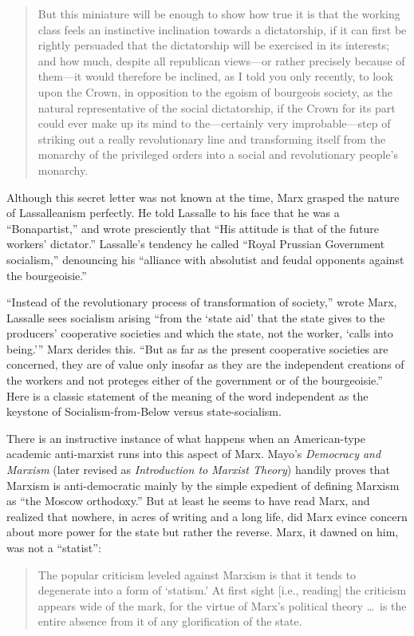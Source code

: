 \blockquote{But this miniature will be enough to show how true it is that the working class feels an instinctive inclination towards a dictatorship, if it can first be rightly persuaded that the dictatorship will be exercised in its interests; and how much, despite all republican views---or rather precisely because of them---it would therefore be inclined, as I told you only recently, to look upon the Crown, in opposition to the egoism of bourgeois society, as the natural representative of the social dictatorship, if the Crown for its part could ever make up its mind to the---certainly very improbable---step of striking out a really revolutionary line and transforming itself from the monarchy of the privileged orders into a social and revolutionary people's monarchy.}

Although this secret letter was not known at the time, Marx grasped the nature of Lassalleanism perfectly. He told Lassalle to his face that he was a ``Bonapartist,'' and wrote presciently that ``His attitude is that of the future workers' dictator.'' Lassalle's tendency he called ``Royal Prussian Government socialism,'' denouncing his ``alliance with absolutist and feudal opponents against the bourgeoisie.''

``Instead of the revolutionary process of transformation of society,'' wrote Marx, Lassalle sees socialism arising ``from the `state aid' that the state gives to the producers' cooperative societies and which the state, not the worker, `calls into being.''' Marx derides this. ``But as far as the present cooperative societies are concerned, they are of value only insofar as they are the independent creations of the workers and not proteges either of the government or of the bourgeoisie.'' Here is a classic statement of the meaning of the word independent as the keystone of Socialism-from-Below versus state-socialism.

There is an instructive instance of what happens when an American-type academic anti-marxist runs into this aspect of Marx. Mayo's \emph{Democracy and Marxism} (later revised as \emph{Introduction to Marxist Theory}) handily proves that Marxism is anti-democratic mainly by the simple expedient of defining Marxism as ``the Moscow orthodoxy.'' But at least he seems to have read Marx, and realized that nowhere, in acres of writing and a long life, did Marx evince concern about more power for the state but rather the reverse. Marx, it dawned on him, was not a ``statist'':

\blockquote{The popular criticism leveled against Marxism is that it tends to degenerate into a form of `statism.' At first sight [i.e., reading] the criticism appears wide of the mark, for the virtue of Marx's political theory \ldots\ is the entire absence from it of any glorification of the state.}

